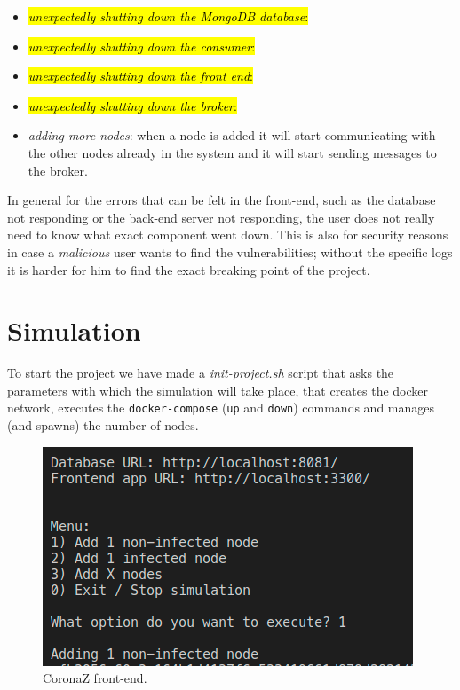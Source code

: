 \documentclass[conference]{IEEEtran}
\begin{document}
	\begin{itemize}
		
		\item \hl{\textit{unexpectedly shutting down the MongoDB database}:}
		
		\item \hl{\textit{unexpectedly shutting down the consumer}:}
		
		\item \hl{\textit{unexpectedly shutting down the front end}:}
		
		\item \hl{\textit{unexpectedly shutting down the broker}:}
		
		\item \textit{adding more nodes}: when a node is added it will start communicating with the other nodes already in the system and it will start sending messages to the broker.
		
	\end{itemize}

	In general for the errors that can be felt in the front-end, such as the database not responding or the back-end server not responding, the user does not really need to know what exact component went down.
	This is also for security reasons in case a \textit{malicious} user wants to find the vulnerabilities; without the specific logs it is harder for him to find the exact breaking point of the project.
	
\section{Simulation}\label{sec:simulation}

	To start the project we have made a \textit{init-project.sh} script that asks the parameters with which the simulation will take place, that creates the docker network, executes the \texttt{docker-compose} (\texttt{up} and \texttt{down}) commands and manages (and spawns) the number of nodes.
	
	\begin{figure}[htbp]
		\centerline{\includegraphics[width=\linewidth]{img/script.png}}
		\caption{CoronaZ front-end.}
		\label{fig:frontend}
	\end{figure}
\end{document}
